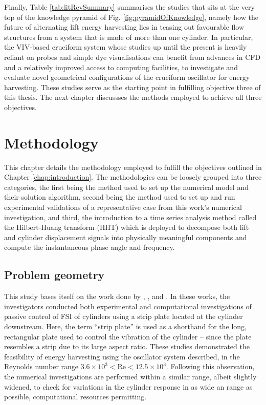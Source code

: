 \documentclass[oneside]{utmthesis}
\begin{document}
Finally, Table \ref{tab:litRevSummary} summarises the studies that sits at the very top of the knowledge pyramid of Fig. \ref{fig:pyramidOfKnowledge}, namely how the future of alternating lift energy harvesting lies in teasing out favourable flow structures from a system that is made of more than one cylinder. In particular, the VIV-based cruciform system whose studies up until the present is heavily reliant on probes and simple dye visualisations can benefit from advances in CFD and a relatively improved access to computing facilities, to investigate and evaluate novel geometrical configurations of the cruciform oscillator for energy harvesting. These studies serve as the starting point in fulfilling objective three of this thesis. The next chapter discussses the methods employed to achieve all three objectives.

\chapter{Methodology} \label{chap:method}
This chapter details the methodology employed to fulfill the objectives outlined in Chapter \ref{chap:introduction}. The methodologies can be loosely grouped into three categories, the first being the method used to set up the numerical model and their solution algorithm, second being the method used to set up and run experimental validations of a representative case from this work's numerical investigation, and third, the introduction to a time series analysis method called the Hilbert-Huang transform (HHT) which is deployed to decompose both lift and cylinder displacement signals into physically meaningful components and compute the instantaneous phase angle and frequency.
\section{Problem geometry} \label{sec:probGeo}
This study bases itself on the work done by \citet{Maruai2017}, \citet{Maruai2018}, and \citet{Koide2013}. In these works, the investigators conducted both experimental and computational investigations of passive control of FSI of cylinders using a strip plate located at the cylinder downstream. Here, the term ``strip plate'' is used as a shorthand for the long, rectangular plate used to control the vibration of the cylinder -- since the plate resembles a strip due to its large aspect ratio. These studies demonstrated the feasibility of energy harvesting using the oscillator system described, in the Reynolds number range $3.6\times10^{3}<\text{Re}<12.5\times10^{3}$. Following this observation, the numerical investigations are performed within a similar \re{} range, albeit slightly widened, to check for variations in the cylinder response in as wide an \re{} range as possible, computational resources permitting.
\end{document}
